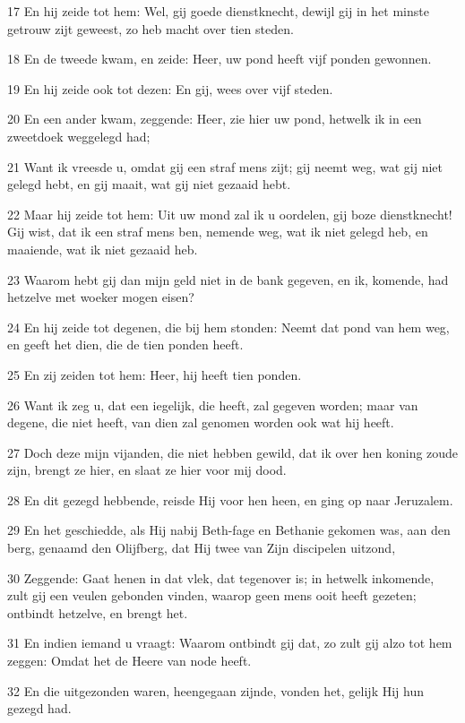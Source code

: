 \par 17 En hij zeide tot hem: Wel, gij goede dienstknecht, dewijl gij in het minste getrouw zijt geweest, zo heb macht over tien steden.
\par 18 En de tweede kwam, en zeide: Heer, uw pond heeft vijf ponden gewonnen.
\par 19 En hij zeide ook tot dezen: En gij, wees over vijf steden.
\par 20 En een ander kwam, zeggende: Heer, zie hier uw pond, hetwelk ik in een zweetdoek weggelegd had;
\par 21 Want ik vreesde u, omdat gij een straf mens zijt; gij neemt weg, wat gij niet gelegd hebt, en gij maait, wat gij niet gezaaid hebt.
\par 22 Maar hij zeide tot hem: Uit uw mond zal ik u oordelen, gij boze dienstknecht! Gij wist, dat ik een straf mens ben, nemende weg, wat ik niet gelegd heb, en maaiende, wat ik niet gezaaid heb.
\par 23 Waarom hebt gij dan mijn geld niet in de bank gegeven, en ik, komende, had hetzelve met woeker mogen eisen?
\par 24 En hij zeide tot degenen, die bij hem stonden: Neemt dat pond van hem weg, en geeft het dien, die de tien ponden heeft.
\par 25 En zij zeiden tot hem: Heer, hij heeft tien ponden.
\par 26 Want ik zeg u, dat een iegelijk, die heeft, zal gegeven worden; maar van degene, die niet heeft, van dien zal genomen worden ook wat hij heeft.
\par 27 Doch deze mijn vijanden, die niet hebben gewild, dat ik over hen koning zoude zijn, brengt ze hier, en slaat ze hier voor mij dood.
\par 28 En dit gezegd hebbende, reisde Hij voor hen heen, en ging op naar Jeruzalem.
\par 29 En het geschiedde, als Hij nabij Beth-fage en Bethanie gekomen was, aan den berg, genaamd den Olijfberg, dat Hij twee van Zijn discipelen uitzond,
\par 30 Zeggende: Gaat henen in dat vlek, dat tegenover is; in hetwelk inkomende, zult gij een veulen gebonden vinden, waarop geen mens ooit heeft gezeten; ontbindt hetzelve, en brengt het.
\par 31 En indien iemand u vraagt: Waarom ontbindt gij dat, zo zult gij alzo tot hem zeggen: Omdat het de Heere van node heeft.
\par 32 En die uitgezonden waren, heengegaan zijnde, vonden het, gelijk Hij hun gezegd had.
